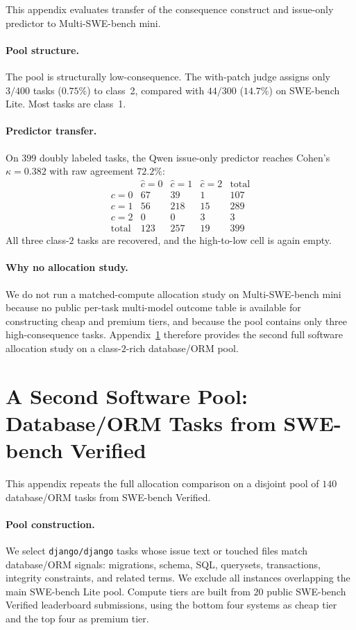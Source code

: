 \documentclass{article}
\begin{document}
This appendix evaluates transfer of the consequence construct and
issue-only predictor to Multi-SWE-bench mini.

\paragraph{Pool structure.}
The pool is structurally low-consequence. The with-patch judge assigns
only $3/400$ tasks ($0.75\%$) to class~2, compared with $44/300$
($14.7\%$) on SWE-bench Lite. Most tasks are class~1.

\paragraph{Predictor transfer.}
On $399$ doubly labeled tasks, the Qwen issue-only predictor reaches
Cohen's $\kappa=0.382$ with raw agreement $72.2\%$:
\[
\begin{array}{c|ccc|c}
& \hat{c}=0 & \hat{c}=1 & \hat{c}=2 & \text{total} \\\hline
c=0 & 67 & 39 & 1 & 107 \\
c=1 & 56 & 218 & 15 & 289 \\
c=2 & 0 & 0 & 3 & 3 \\\hline
\text{total} & 123 & 257 & 19 & 399
\end{array}
\]
All three class-$2$ tasks are recovered, and the high-to-low cell is
again empty.

\paragraph{Why no allocation study.}
We do not run a matched-compute allocation study on Multi-SWE-bench
mini because no public per-task multi-model outcome table is available
for constructing cheap and premium tiers, and because the pool contains
only three high-consequence tasks. Appendix~\ref{app:seconddomain}
therefore provides the second full software allocation study on a
class-$2$-rich database/ORM pool.

\section{A Second Software Pool: Database/ORM Tasks from SWE-bench Verified}
\label{app:seconddomain}

This appendix repeats the full allocation comparison on a disjoint
pool of $140$ database/ORM tasks from SWE-bench Verified.

\paragraph{Pool construction.}
We select \texttt{django/django} tasks whose issue text or touched
files match database/ORM signals: migrations, schema, SQL, querysets,
transactions, integrity constraints, and related terms. We exclude all
instances overlapping the main SWE-bench Lite pool. Compute tiers are
built from $20$ public SWE-bench Verified leaderboard submissions,
using the bottom four systems as cheap tier and the top four as
premium tier.
\end{document}
